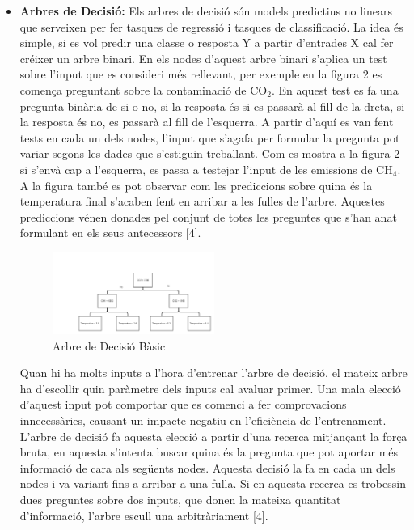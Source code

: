 \documentclass[10pt,a4paper,twocolumn,twoside]{article}
\begin{document}
\begin{itemize}
\item \textbf{Arbres de Decisió:} Els arbres de decisió són models predictius no linears que serveixen per fer tasques de regressió i tasques de classificació. La idea és simple, si es vol predir una classe o resposta Y a partir d'entrades X cal fer créixer un arbre binari. En els nodes d'aquest arbre binari s'aplica un test sobre l'input que es consideri més rellevant, per exemple en la figura 2 es comença preguntant sobre la contaminació de CO$_2$. En aquest test es fa una pregunta binària de si o no, si la resposta és si es passarà al fill de la dreta, si la resposta és no, es passarà al fill de l'esquerra. A partir d'aquí es van fent tests en cada un dels nodes, l'input que s'agafa per formular la pregunta pot variar segons les dades que s'estiguin treballant. Com es mostra a la figura 2 si s'envà cap a l'esquerra, es passa a testejar l'input de les emissions de CH$_4$. A la figura també es pot observar com les prediccions sobre quina és la temperatura final s'acaben fent en arribar a les fulles de l'arbre. Aquestes prediccions vénen donades pel conjunt de totes les preguntes que s'han anat formulant en els seus antecessors [4].
\begin{figure}[!h]
\centering
	\includegraphics[width=0.5\textwidth]{../img/arbreDecisioSimple}
	\caption{Arbre de Decisió Bàsic}
	\label{fig-DecisionTree}
\end{figure}
Quan hi ha molts inputs a l'hora d'entrenar l'arbre de decisió, el mateix arbre ha d'escollir quin paràmetre dels inputs cal avaluar primer. Una mala elecció d'aquest input pot comportar que es comenci a fer comprovacions innecessàries, causant un impacte negatiu en l'eficiència de l'entrenament. L'arbre de decisió fa aquesta elecció a partir d'una recerca mitjançant la força bruta, en aquesta s'intenta buscar quina és la pregunta que pot aportar més informació de cara als següents nodes. Aquesta decisió la fa en cada un dels nodes i va variant fins a arribar a una fulla. Si en aquesta recerca es trobessin dues preguntes sobre dos inputs, que donen la mateixa quantitat d'informació, l'arbre escull una arbitràriament [4].


\end{itemize}
\end{document}
